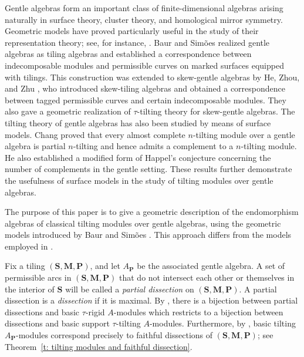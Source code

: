 \documentclass[a4paper,10pt]{amsart}
\theoremstyle{plain}          %
\theoremstyle{definition}
\def\SS{\mathbf{S}}
\def\MM{\mathbf{M}}
\def\PP{\mathbf{P}}
\def\MM{\mathbf{M}}
\begin{document}
 Gentle algebras form an important class of finite-dimensional algebras arising naturally in surface theory, cluster theory, and homological mirror symmetry. Geometric models have proved particularly useful in the study of their representation theory; see, for instance, \cite{ABCJP,APS,BZ,CCS,CS,HKK,OPS,PPP}. 
 Baur and Sim\~{o}es \cite{BS} realized gentle algebras as tiling algebras and established a correspondence between indecomposable modules and permissible curves on marked surfaces equipped with tilings. This construction was extended to skew-gentle algebras by He, Zhou, and Zhu \cite{HZZ}, who introduced skew-tiling algebras and obtained a correspondence between tagged permissible curves and certain indecomposable modules. They also gave a geometric realization of $\tau$-tilting theory for skew-gentle algebras. The tilting theory of gentle algebras has also been studied by means of surface models. Chang \cite{Chang} proved that every almost complete $n$-tilting module over a gentle algebra is partial $n$-tilting and hence admits a complement to a $n$-tilting module. He also established a modified form of Happel's conjecture concerning the number of complements in the gentle setting. These results further demonstrate the usefulness of surface models in the study of tilting modules over gentle algebras.
 

The purpose of this paper is to give a geometric description of the endomorphism algebras of classical tilting modules over gentle algebras, using the geometric models introduced by Baur and Sim\~{o}es \cite{BS}. This approach differs from the models employed in \cite{Chang}. 

Fix a tiling $(\SS,\MM,\PP)$, and let $A_{\PP}$ be the associated gentle algebra. 
 A set of  permissible arcs in $(\SS,\MM,\PP)$  that do not intersect each other or themselves in the interior of $\SS$ will be called a {\it partial dissection} on $(\SS,\MM,\PP)$. A partial dissection is a {\it dissection} if it is maximal. By \cite{HZZ},  there is  a bijection between partial dissections and basic $\tau$-rigid $A$-modules which restricts to a bijection between dissections and basic support $\tau$-tilting $A$-modules. Furthermore, by \cite{Nie}, basic tilting $A_{\PP}$-modules correspond precisely to faithful dissections of $(\SS,\MM,\PP)$; see Theorem~\ref{t: tilting modules and faithful dissection}. 
\end{document}
